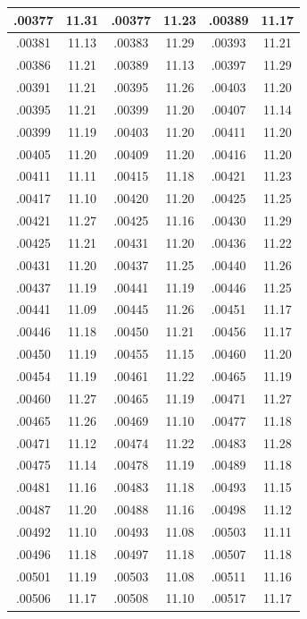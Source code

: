 \documentclass[10pt,twoside]{report}
\begin{document}
\begin{appendices}
\begin{longtable}{|c|c||c|c||c|c|}
.00377 & 11.31 & .00377 & 11.23 & .00389 & 11.17\\\hline
.00381 & 11.13 & .00383 & 11.29 & .00393 & 11.21\\\hline
.00386 & 11.21 & .00389 & 11.13 & .00397 & 11.29\\\hline
.00391 & 11.21 & .00395 & 11.26 & .00403 & 11.20\\\hline
.00395 & 11.21 & .00399 & 11.20 & .00407 & 11.14\\\hline
.00399 & 11.19 & .00403 & 11.20 & .00411 & 11.20\\\hline
.00405 & 11.20 & .00409 & 11.20 & .00416 & 11.20\\\hline
.00411 & 11.11 & .00415 & 11.18 & .00421 & 11.23\\\hline
.00417 & 11.10 & .00420 & 11.20 & .00425 & 11.25\\\hline
.00421 & 11.27 & .00425 & 11.16 & .00430 & 11.29\\\hline
.00425 & 11.21 & .00431 & 11.20 & .00436 & 11.22\\\hline
.00431 & 11.20 & .00437 & 11.25 & .00440 & 11.26\\\hline
.00437 & 11.19 & .00441 & 11.19 & .00446 & 11.25\\\hline
.00441 & 11.09 & .00445 & 11.26 & .00451 & 11.17\\\hline
.00446 & 11.18 & .00450 & 11.21 & .00456 & 11.17\\\hline
.00450 & 11.19 & .00455 & 11.15 & .00460 & 11.20\\\hline
.00454 & 11.19 & .00461 & 11.22 & .00465 & 11.19\\\hline
.00460 & 11.27 & .00465 & 11.19 & .00471 & 11.27\\\hline
.00465 & 11.26 & .00469 & 11.10 & .00477 & 11.18\\\hline
.00471 & 11.12 & .00474 & 11.22 & .00483 & 11.28\\\hline
.00475 & 11.14 & .00478 & 11.19 & .00489 & 11.18\\\hline
.00481 & 11.16 & .00483 & 11.18 & .00493 & 11.15\\\hline
.00487 & 11.20 & .00488 & 11.16 & .00498 & 11.12\\\hline
.00492 & 11.10 & .00493 & 11.08 & .00503 & 11.11\\\hline
.00496 & 11.18 & .00497 & 11.18 & .00507 & 11.18\\\hline
.00501 & 11.19 & .00503 & 11.08 & .00511 & 11.16\\\hline
.00506 & 11.17 & .00508 & 11.10 & .00517 & 11.17\\\hline

\end{longtable}
\end{appendices}
\end{document}
